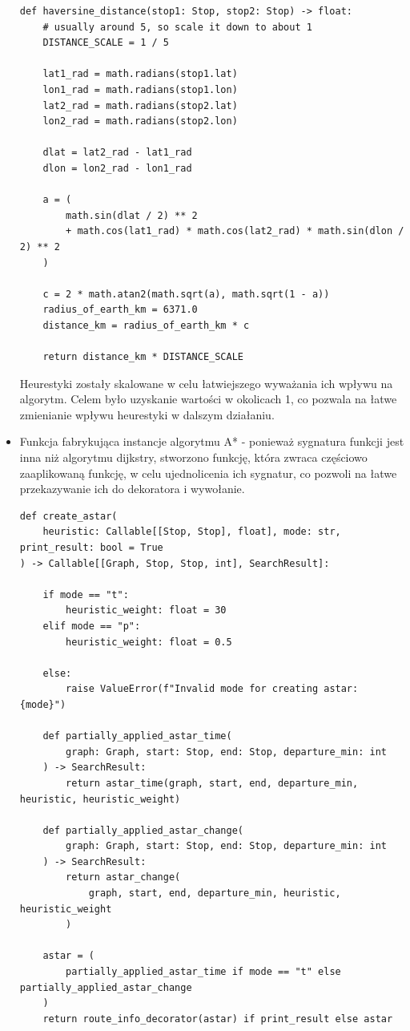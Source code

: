 \documentclass[a4paper, 12pt]{article}
\begin{document}
\begin{itemize}
\begin{lstlisting}
def haversine_distance(stop1: Stop, stop2: Stop) -> float:
    # usually around 5, so scale it down to about 1
    DISTANCE_SCALE = 1 / 5

    lat1_rad = math.radians(stop1.lat)
    lon1_rad = math.radians(stop1.lon)
    lat2_rad = math.radians(stop2.lat)
    lon2_rad = math.radians(stop2.lon)

    dlat = lat2_rad - lat1_rad
    dlon = lon2_rad - lon1_rad

    a = (
        math.sin(dlat / 2) ** 2
        + math.cos(lat1_rad) * math.cos(lat2_rad) * math.sin(dlon / 2) ** 2
    )

    c = 2 * math.atan2(math.sqrt(a), math.sqrt(1 - a))
    radius_of_earth_km = 6371.0
    distance_km = radius_of_earth_km * c

    return distance_km * DISTANCE_SCALE
\end{lstlisting}
  Heurestyki zostały skalowane w celu łatwiejszego wyważania ich wpływu na algorytm.
  Celem było uzyskanie wartości w okolicach 1, co pozwala na łatwe zmienianie wpływu heurestyki w
  dalszym działaniu.

\item Funkcja fabrykująca instancje algorytmu A* - ponieważ 
sygnatura funkcji jest inna niż algorytmu dijkstry, stworzono funkcję, która zwraca częściowo zaaplikowaną
funkcję, w celu ujednolicenia ich sygnatur, co pozwoli na łatwe przekazywanie ich do dekoratora i wywołanie.

\begin{lstlisting}
def create_astar(
    heuristic: Callable[[Stop, Stop], float], mode: str, print_result: bool = True
) -> Callable[[Graph, Stop, Stop, int], SearchResult]:

    if mode == "t":
        heuristic_weight: float = 30
    elif mode == "p":
        heuristic_weight: float = 0.5

    else:
        raise ValueError(f"Invalid mode for creating astar: {mode}")

    def partially_applied_astar_time(
        graph: Graph, start: Stop, end: Stop, departure_min: int
    ) -> SearchResult:
        return astar_time(graph, start, end, departure_min, heuristic, heuristic_weight)

    def partially_applied_astar_change(
        graph: Graph, start: Stop, end: Stop, departure_min: int
    ) -> SearchResult:
        return astar_change(
            graph, start, end, departure_min, heuristic, heuristic_weight
        )

    astar = (
        partially_applied_astar_time if mode == "t" else partially_applied_astar_change
    )
    return route_info_decorator(astar) if print_result else astar
\end{lstlisting}
\end{itemize}
\end{document}
